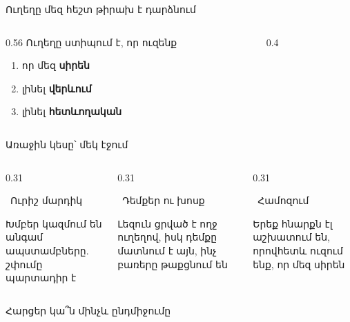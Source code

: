 \begin{frame}{Ուղեղը մեզ հեշտ թիրախ է դարձնում}
  \begin{columns}[c]
    \begin{column}{0.56\textwidth}
      Ուղեղը ստիպում է, որ ուզենք\par\smallskip
      \begin{enumerate}
        \item<1-> որ մեզ \textbf{սիրեն}
        \item<2-> լինել \textbf{վերևում}
        \item<3-> լինել \textbf{հետևողական}
      \end{enumerate}
      \vspace{2mm}
    \end{column}
    \begin{column}{0.4\textwidth}
    \end{column}
  \end{columns}
\end{frame}

\begin{frame}{Առաջին կեսը՝ մեկ էջում}
  \begin{columns}[T]
    \begin{column}{0.31\textwidth}
      \begin{card}[colback=peach!35!cardwhite]\ {\blackfont Ուրիշ մարդիկ}\par Խմբեր կազմում են անգամ ապստամբները. շփումը պարտադիր է\end{card}
    \end{column}
    \begin{column}{0.31\textwidth}
      \begin{card}[colback=mint!35!cardwhite]\ {\blackfont Դեմքեր ու խոսք}\par Լեզուն ցրված է ողջ ուղեղով, իսկ դեմքը մատնում է այն, ինչ բառերը թաքցնում են\end{card}
    \end{column}
    \begin{column}{0.31\textwidth}
      \begin{card}[colback=butter!45!cream]\ {\blackfont Համոզում}\par Երեք հնարքն էլ աշխատում են, որովհետև ուզում ենք, որ մեզ սիրեն\end{card}
    \end{column}
  \end{columns}
  \vspace{2mm}
  \centering
  \par
  {\small Հարցեր կա՞ն մինչև ընդմիջումը}
\end{frame}

